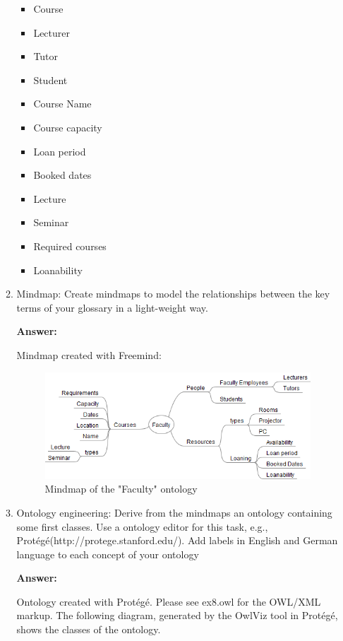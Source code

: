 \documentclass[10pt,a4paper]{article}
\begin{document}
\begin{enumerate}
\begin{enumerate}
\begin{itemize}
\item Course
\item Lecturer
\item Tutor
\item Student
\item Course Name
\item Course capacity
\item Loan period
\item Booked dates
\item Lecture 
\item Seminar
\item Required courses
\item Loanability
\end{itemize}

\item Mindmap: Create mindmaps to model the relationships between the key terms of your glossary in a light-weight way.

\textbf{Answer:}

Mindmap created with Freemind:

\begin{figure}[H]
  \caption{Mindmap of the "Faculty" ontology}
  \centering
    \includegraphics[scale=0.7]{Faculty_mindmap.png}
\end{figure}



\item Ontology engineering: Derive from the mindmaps an ontology containing some first classes. Use a ontology editor for this task, e.g., Protégé(http://protege.stanford.edu/). Add labels in English and German language to each concept of your ontology

\textbf{Answer:}

Ontology created with Protégé. Please see ex8.owl for the OWL/XML markup. The following diagram, generated by the OwlViz tool in Protégé, shows the classes of the ontology.


\end{enumerate}
\end{enumerate}
\end{document}
